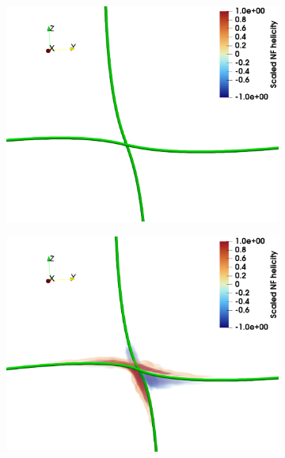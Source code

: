 \documentclass[%
 reprint,
 amsmath,amssymb,
 aps,
 prl,
]{revtex4-2}
\begin{document}
\begin{figure}
\begin{subfigure}[b]{0.24\textwidth}
	\end{subfigure} \hfill
	\begin{subfigure}[b]{0.24\textwidth}
		\centering
		\includegraphics*[width=\textwidth]{snaps-hel-1.pdf}
	\end{subfigure}
	\begin{subfigure}[b]{0.24\textwidth}
		\centering
		\includegraphics*[width=\textwidth]{snaps-hel-2.pdf}
	\end{subfigure}
    \begin{subfigure}[b]{0.24\textwidth}
		\centering

\end{subfigure}
\end{figure}
\end{document}
